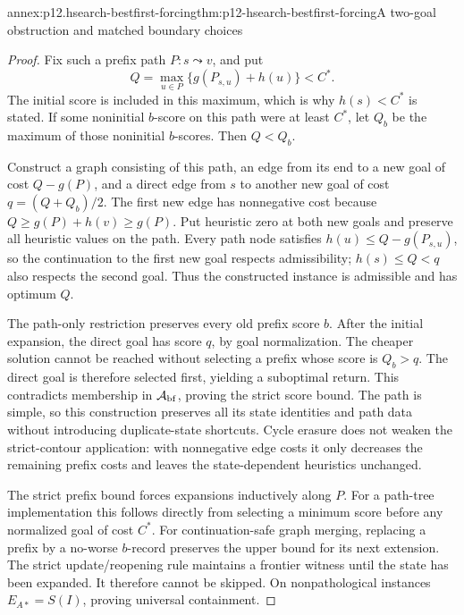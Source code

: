 \begin{annexitem}{annex:p12.hsearch-bestfirst-forcing}{thm:p12-hsearch-bestfirst-forcing}{A two-goal obstruction and matched boundary choices}
\begin{proof}
Fix such a prefix path \(P:s\leadsto v\), and put
\[
 Q=\max_{u\in P}\{g(P_{s,u})+h(u)\}<C^*.
\]
The initial score is included in this maximum, which is why
\(h(s)<C^*\) is stated. If some noninitial \(b\)-score on this
path were at least \(C^*\), let \(Q_b\) be the maximum of those
noninitial \(b\)-scores. Then \(Q<Q_b\).

Construct a graph consisting of this path, an edge from its end to a new
goal of cost \(Q-g(P)\), and a direct edge from \(s\) to another
new goal of cost \(q=(Q+Q_b)/2\). The first new edge has nonnegative
cost because \(Q\ge g(P)+h(v)\ge g(P)\). Put heuristic zero
at both new goals and preserve all heuristic values on the path. Every
path node satisfies
\(h(u)\le Q-g(P_{s,u})\), so the continuation to the first new
goal respects admissibility; \(h(s)\le Q<q\) also respects the
second goal. Thus the constructed instance is admissible and has optimum
\(Q\).

The path-only restriction preserves every old prefix score \(b\).
After the initial expansion, the direct goal has score \(q\), by
goal normalization. The cheaper solution cannot be reached without
selecting a prefix whose score is \(Q_b>q\). The direct goal is
therefore selected first, yielding a suboptimal return. This contradicts
membership in \(\mathcal A_{\rm bf}\), proving the strict score bound.
The path is simple, so this construction preserves all its state
identities and path data without introducing duplicate-state shortcuts.
Cycle erasure does not weaken the strict-contour application: with
nonnegative edge costs it only decreases the remaining prefix costs and
leaves the state-dependent heuristics unchanged.

The strict prefix bound forces expansions inductively along \(P\).
For a path-tree implementation this follows directly from selecting a
minimum score before any normalized goal of cost \(C^*\). For
continuation-safe graph merging, replacing a prefix by a no-worse
\(b\)-record preserves the upper bound for its next extension. The
strict update/reopening rule maintains a frontier witness until the state
has been expanded. It therefore cannot be skipped. On nonpathological
instances \(E_{A*}=S(I)\), proving universal containment.


\end{proof}
\end{annexitem}
